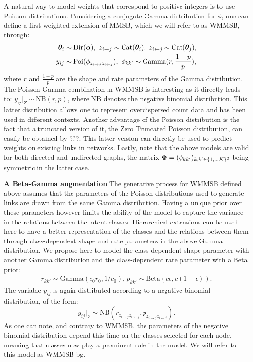 A natural way to model weights that correspond to positive integers is to use Poisson distributions. Considering a conjugate Gamma distribution for $\phi$, one can define a first weighted extension of MMSB, which we will refer to as WMMSB, through:
%
\begin{align*} \label{eq:generative}
\boldsymbol{\theta}_i & \sim \textrm{Dir}(\boldsymbol{\alpha}), \,\, z_{i\rightarrow j} \sim \textrm{Cat}(\boldsymbol{\theta}_i), \,\, z_{i\leftarrow j} \sim \textrm{Cat}(\boldsymbol{\theta}_j), \\
y_{ij} &\sim \textrm{Poi}(\phi_{z_{i \rightarrow j}z_{i \leftarrow j}}), \,\, \phi_{kk'} \sim \textrm{Gamma}(r, \frac{1-p}{p}),
\end{align*}
%
where $r$ and $\frac{1-p}{p}$ are the shape and rate parameters of the Gamma distribution. The Poisson-Gamma combination in WMMSB is interesting as it directly leads to: $y_{ij}|_{Z} \sim \textrm{NB}(r,p)$, where $\textrm{NB}$ denotes the negative binomial distribution. This latter distribution allows one to represent overdispersed count data and has been used in different contexts.%
 Another advantage of the Poisson distribution is the fact that a truncated version of it, the Zero Truncated Poisson distribution, can easily be obtained by ???. This latter version can directly be used to predict weights on existing links in networks. Lastly, note that the above models are valid for both directed and undirected graphs, the matrix $\boldsymbol{\Phi} = (\phi_{kk'})_{k,k' \in \{1,..,K\}^2}$ being symmetric in the latter case.

\textbf{A Beta-Gamma augmentation} The generative process for WMMSB defined above assumes that the parameters of the Poisson distributions used to generate links are drawn from the same Gamma distribution. Having a unique prior over these parameters however limits the ability of the model to capture the variance in the relations between the latent classes. Hierarchical extensions can be used here to have a better representation of the classes and the relations between them through class-dependent shape and rate parameters in the above Gamma distribution. We propose here to model the class-dependent shape parameter with another Gamma distribution and the class-dependent rate parameter with a Beta prior:
%
\begin{gather*}
r_{kk'} \sim \textrm{Gamma}(c_0r_0, 1/c_0), \, p_{kk'} \sim \textrm{Beta}(c\epsilon, c(1-\epsilon)).
\end{gather*}
%
The variable $y_{ij}$ is again distributed according to a negative binomial distribution, of the form:
%
\begin{equation}\label{eq:yNB}
y_{ij}|_{Z} \sim \textrm{NB}(r_{z_{i \rightarrow j} z_{i \leftarrow j}},p_{z_{i \rightarrow j} z_{i \leftarrow j}}).
\end{equation}
%
As one can note, and contrary to WMMSB, the parameters of the negative binomial distribution depend this time on the classes selected for each node, meaning that classes now play a prominent role in the model. We will refer to this model as WMMSB-bg.

